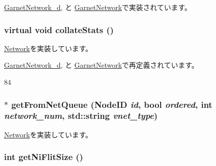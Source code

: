 \hyperlink{classGarnetNetwork__d_ad98444c4b69e4656dd10dc4ea3ad80dd}{GarnetNetwork\_\-d}, と \hyperlink{classGarnetNetwork_ad98444c4b69e4656dd10dc4ea3ad80dd}{GarnetNetwork}で実装されています。\hypertarget{classBaseGarnetNetwork_ae3089fd60541650eefd9605c2c1abc68}{
\subsubsection[{collateStats}]{\setlength{\rightskip}{0pt plus 5cm}virtual void collateStats ()}}
\label{classBaseGarnetNetwork_ae3089fd60541650eefd9605c2c1abc68}


\hyperlink{classNetwork_ab6b1b00ea63b4d41ec52e154052d47ee}{Network}を実装しています。

\hyperlink{classGarnetNetwork__d_a208669cbc0bb1d52565956ca8c690c55}{GarnetNetwork\_\-d}, と \hyperlink{classGarnetNetwork_a208669cbc0bb1d52565956ca8c690c55}{GarnetNetwork}で再定義されています。


\begin{DoxyCode}
84 {}
\end{DoxyCode}
\hypertarget{classBaseGarnetNetwork_a95cf297000502b35bd0666d6b034b9bf}{
\subsubsection[{getFromNetQueue}]{$\ast$ getFromNetQueue ({\bf NodeID} {\em id}, \/  bool {\em ordered}, \/  int {\em network\_\-num}, \/  std::string {\em vnet\_\-type})}}
\label{classBaseGarnetNetwork_a95cf297000502b35bd0666d6b034b9bf}


\hyperlink{classNetwork_a28233bfa034d11609e66d504bce62359}{Network}を実装しています。\hypertarget{classBaseGarnetNetwork_a78fde0f587d4c7fd379f85526a09a952}{
\subsubsection[{getNiFlitSize}]{\setlength{\rightskip}{0pt plus 5cm}int getNiFlitSize ()}}
\label{classBaseGarnetNetwork_a78fde0f587d4c7fd379f85526a09a952}



